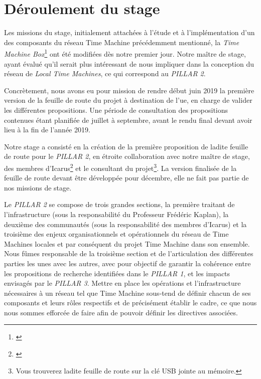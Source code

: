 \section{Déroulement du stage}

Les missions du stage, initialement attachées à l'étude et à l'implémentation d'un des composants du réseau Time Machine précédemment mentionné, la \textit{Time Machine Box}\footnote{\cite{epfl.dhlab_home_nodate}} ont été modifiées dès notre premier jour. Notre maître de stage, ayant évalué qu'il serait plus intéressant de nous impliquer dans la conception du réseau de \textit{Local Time Machines}, ce qui correspond au \textit{PILLAR 2}. 

Concrètement, nous avons eu pour mission de rendre début juin 2019 la première version de la feuille de route du projet à destination de l'\gls{ue}, en charge de valider les différentes propositions. Une période de consultation des propositions contenues étant planifiée de juillet à septembre, avant le rendu final devant avoir lieu à la fin de l'année 2019. 

Notre stage a consisté en la création de la première proposition de ladite feuille de route pour le \textit{PILLAR 2}, en étroite collaboration avec notre maître de stage, des membres d'Icarus\footnote{\cite{icarus_icarus_nodate}} et le consultant du projet\footnote{Vous trouverez ladite feuille de route sur la clé USB jointe au mémoire.}. La version finalisée de la feuille de route devant être développée pour décembre, elle ne fait pas partie de nos missions de stage. 

Le \textit{PILLAR 2} se compose de trois grandes sections, la première traitant de l'infrastructure (sous la responsabilité du Professeur Frédéric Kaplan), la deuxième des communautés (sous la responsabilité des membres d'Icarus) et la troisième des enjeux organisationnels et opérationnels du réseau de Time Machines locales et par conséquent du projet Time Machine dans son ensemble. Nous fûmes responsable de la troisième section et de l'articulation des différentes parties les unes avec les autres, avec pour objectif de garantir la cohérence entre les propositions de recherche identifiées dans le \textit{PILLAR 1}, et les impacts envisagés par le \textit{PILLAR 3}. Mettre en place les opérations et l'infrastructure nécessaires à un réseau tel que Time Machine sous-tend de définir chacun de ses composants et leurs rôles respectifs et de précisément établir le cadre, ce que nous nous sommes efforcée de faire afin de pouvoir définir les directives associées. 

